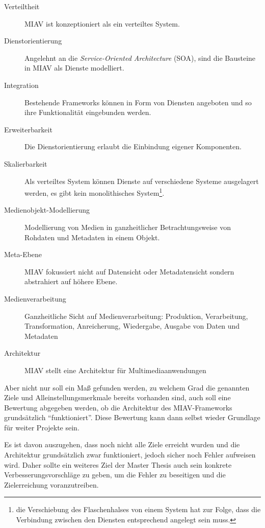 \documentclass[11pt,headsepline,a4paper,bibtotoc,liststotoc,DIV12,BCOR12mm]{scrartcl}
\begin{document}
  \begin{description}
  	\item[Verteiltheit] MIAV ist konzeptioniert als ein verteiltes System.
  	\item[Dienstorientierung] Angelehnt an die \emph{Service-Oriented Architecture}  (SOA), sind die Bausteine in MIAV als Dienste modelliert.
  	\item[Integration] Bestehende Frameworks können in Form von Diensten angeboten und so ihre Funktionalität eingebunden werden.
  	\item[Erweiterbarkeit] Die Dienstorientierung erlaubt die Einbindung eigener Komponenten.
  	\item[Skalierbarkeit] Als verteiltes System können Dienste auf verschiedene Systeme ausgelagert werden, es gibt kein monolithisches System\footnote{die Verschiebung des Flaschenhalses von einem System hat zur Folge, dass die Verbindung zwischen den Diensten entsprechend angelegt sein muss.}.
  	\item[Medienobjekt-Modellierung] Modellierung von Medien in ganzheitlicher Betrachtungsweise von Rohdaten und Metadaten in einem Objekt.
  	\item[Meta-Ebene] MIAV fokussiert nicht auf Datensicht oder Metadatensicht sondern abstrahiert auf höhere Ebene.
  	\item[Medienverarbeitung] Ganzheitliche Sicht auf Medienverarbeitung: Produktion, Verarbeitung, Transformation, Anreicherung, Wiedergabe, Ausgabe von Daten und Metadaten
  	\item[Architektur] MIAV stellt eine Architektur für Multimediaanwendungen
  \end{description}
  
  Aber nicht nur soll ein Maß gefunden werden, zu welchem Grad die genannten Ziele und Alleinstellungsmerkmale bereits vorhanden sind, auch soll eine Bewertung abgegeben werden, ob die Architektur des MIAV-Frameworks grundsätzlich "`funktioniert"'. Diese Bewertung kann dann selbst wieder Grundlage für weiter Projekte sein.
  
  Es ist davon auszugehen, dass noch nicht alle Ziele erreicht wurden und die Architektur grundsätzlich zwar funktioniert, jedoch sicher noch Fehler aufweisen wird. Daher sollte ein weiteres Ziel der Master Thesis auch sein konkrete Verbesserungsvorschläge zu geben, um die Fehler zu beseitigen und die Zielerreichung voranzutreiben.
  
\end{document}
